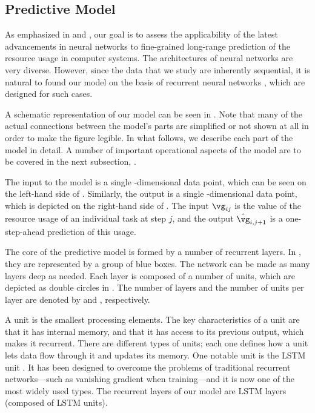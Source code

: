 \subsection{Predictive Model}

As emphasized in  and , our goal is
to assess the applicability of the latest advancements in neural networks
\cite{goodfellow2016} to fine-grained long-range prediction of the resource
usage in computer systems. The architectures of neural networks are very
diverse. However, since the data that we study are inherently sequential, it is
natural to found our model on the basis of recurrent neural networks
\cite{goodfellow2016}, which are designed for such cases.

A schematic representation of our model can be seen in . Note
that many of the actual connections between the model's parts are simplified or
not shown at all in order to make the figure legible. In what follows, we
describe each part of the model in detail. A number of important operational
aspects of the model are to be covered in the next subsection,
.

The input to the model is a single \ng-dimensional data point, which can be seen
on the left-hand side of . Similarly, the output is a single
\ng-dimensional data point, which is depicted on the right-hand side of
. The input $\vg_{ij}$ is the value of the resource usage of
an individual task at step $j$, and the output $\hat{\vg}_{i, j + 1}$ is a
one-step-ahead prediction of this usage.

The core of the predictive model is formed by a number of recurrent layers. In
, they are represented by a group of blue boxes. The network
can be made as many layers deep as needed. Each layer is composed of a number of
units, which are depicted as double circles in . The number of
layers and the number of units per layer are denoted by \nl and \nu,
respectively.

A unit is the smallest processing elements. The key characteristics of a unit
are that it has internal memory, and that it has access to its previous output,
which makes it recurrent. There are different types of units; each one defines
how a unit lets data flow through it and updates its memory. One notable unit is
the \ac{LSTM} unit \cite{hochreiter1997}. It has been designed to overcome the
problems of traditional recurrent networks---such as vanishing gradient when
training---and it is now one of the most widely used types. The recurrent layers
of our model are \ac{LSTM} layers (composed of \ac{LSTM} units).

